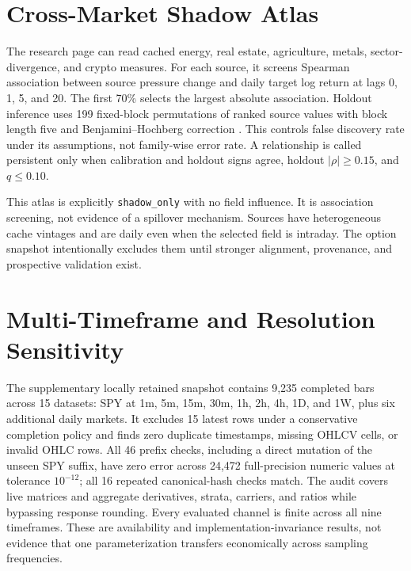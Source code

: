 \documentclass{article}
\begin{document}
\section{Cross-Market Shadow Atlas}

The research page can read cached energy, real estate, agriculture, metals, sector-divergence, and crypto measures. For each source, it screens Spearman association \citep{spearman1904association} between source pressure change and daily target log return at lags 0, 1, 5, and 20. The first 70\% selects the largest absolute association. Holdout inference uses 199 fixed-block permutations of ranked source values with block length five and Benjamini--Hochberg correction \citep{benjaminihochberg1995fdr}. This controls false discovery rate under its assumptions, not family-wise error rate. A relationship is called persistent only when calibration and holdout signs agree, holdout $|\rho|\ge0.15$, and $q\le0.10$.

This atlas is explicitly \texttt{shadow\_only} with no field influence. It is association screening, not evidence of a spillover mechanism. Sources have heterogeneous cache vintages and are daily even when the selected field is intraday. The option snapshot intentionally excludes them until stronger alignment, provenance, and prospective validation exist.

\section{Multi-Timeframe and Resolution Sensitivity}
\label{app:resolution}

The supplementary locally retained snapshot contains 9,235 completed bars across 15 datasets: SPY at 1m, 5m, 15m, 30m, 1h, 2h, 4h, 1D, and 1W, plus six additional daily markets. It excludes 15 latest rows under a conservative completion policy and finds zero duplicate timestamps, missing OHLCV cells, or invalid OHLC rows. All 46 prefix checks, including a direct mutation of the unseen SPY suffix, have zero error across 24,472 full-precision numeric values at tolerance $10^{-12}$; all 16 repeated canonical-hash checks match. The audit covers live matrices and aggregate derivatives, strata, carriers, and ratios while bypassing response rounding. Every evaluated channel is finite across all nine timeframes. These are availability and implementation-invariance results, not evidence that one parameterization transfers economically across sampling frequencies.
\end{document}
